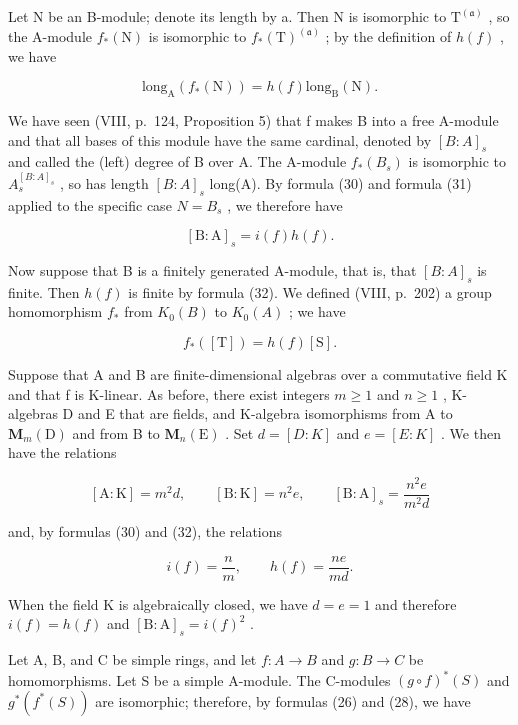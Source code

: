 Let N be an B-module; denote its length by a. Then N is isomorphic to \(\mathrm{T}^{(\mathfrak{a})}\) , so the A-module \(f_{*}(\mathrm{N})\) is isomorphic to \(f_{*}(\mathrm{T})^{(\mathfrak{a})}\) ; by the definition of \(h(f)\) , we have

\[
\mathrm{long} _ {\mathrm{A}} (f _ {*} (\mathrm{N})) = h (f) \mathrm{long} _ {\mathrm{B}} (\mathrm{N}).\tag{31}
\]

We have seen (VIII, p.~124, Proposition 5) that f makes B into a free A-module and that all bases of this module have the same cardinal, denoted by \([B:A]_{s}\) and called the (left) degree of B over A. The A-module \(f_{*}(B_{s})\) is isomorphic to \(A_{s}^{[B:A]_{s}}\) , so has length \([B:A]_{s}\) long(A). By formula (30) and formula (31) applied to the specific case \(N=B_{s}\) , we therefore have

\[
[ \mathrm{B}: \mathrm{A} ] _ {s} = i (f) h (f).\tag{32}
\]

Now suppose that B is a finitely generated A-module, that is, that \([B:A]_{s}\) is finite. Then \(h(f)\) is finite by formula (32). We defined (VIII, p.~202) a group homomorphism \(f_{*}\) from \(K_{0}(B)\) to \(K_{0}(A)\) ; we have

\[
f _ {*} ([ \mathrm{T} ]) = h (f) [ \mathrm{S} ].\tag{33}
\]

Suppose that A and B are finite-dimensional algebras over a commutative field K and that f is K-linear. As before, there exist integers \(m \geqslant 1\) and \(n \geqslant 1\) , K-algebras D and E that are fields, and K-algebra isomorphisms from A to \(\mathbf{M}_{m}(\mathrm{D})\) and from B to \(\mathbf{M}_{n}(\mathrm{E})\) . Set \(d = [D : K]\) and \(e = [E : K]\) . We then have the relations

\[
[ \mathrm{A}: \mathrm{K} ] = m ^ {2} d, \qquad [ \mathrm{B}: \mathrm{K} ] = n ^ {2} e, \qquad [ \mathrm{B}: \mathrm{A} ] _ {s} = \frac {n ^ {2} e}{m ^ {2} d}
\]

and, by formulas (30) and (32), the relations

\[
i (f) = \frac {n}{m}, \qquad h (f) = \frac {n e}{m d}.
\]

When the field \(\mathrm{K}\) is algebraically closed, we have \(d = e = 1\) and therefore \(i(f) = h(f)\) and \([\mathrm{B}:\mathrm{A}]_s = i(f)^2\) .

Let A, B, and C be simple rings, and let \(f: A \to B\) and \(g: B \to C\) be homomorphisms. Let S be a simple A-module. The C-modules \((g \circ f)^{*}(S)\) and \(g^{*}(f^{*}(S))\) are isomorphic; therefore, by formulas (26) and (28), we have

